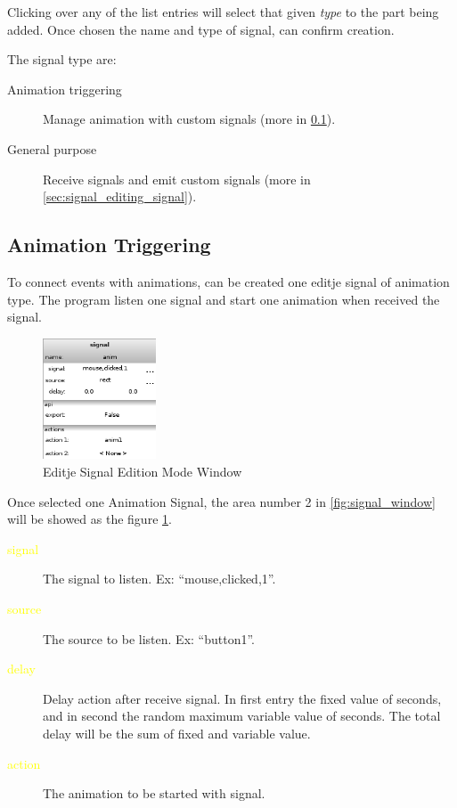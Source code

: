 \documentclass[a4paper]{profusion}
\newcommand{\GUIEditable}[1]{\textcolor{yellow}{#1}} %
\begin{document}
Clicking over any of the list entries will select that given
\emph{type} to the part being added. Once chosen the name and type of
signal, can confirm creation.

The signal type are:
\begin{description}
 \item[Animation triggering] Manage animation with custom signals (more in
   \ref{sec:signal_editing_animation}).
 \item[General purpose] Receive signals and emit custom signals (more in
   \ref{sec:signal_editing_signal}).
\end{description}

\subsection{Animation Triggering}
\label{sec:signal_editing_animation}

To connect events with animations, can be created one editje signal of
animation type. The program listen one signal and start one animation
when received the signal.

\begin{figure}
 \centering
 \includegraphics[width=0.3\textwidth]{./images/signal_anim.png}
 \caption{Editje Signal Edition Mode Window}
 \label{fig:signal_animation_config}
\end{figure}

Once selected one Animation Signal, the area number 2 in
\ref{fig:signal_window} will be showed as the figure
\ref{fig:signal_animation_config}.

\begin{description}
 \item[\GUIEditable{signal}] The signal to listen. Ex:
   ``mouse,clicked,1''.
 \item[\GUIEditable{source}] The source to be listen. Ex: ``button1''.
 \item[\GUIEditable{delay}] Delay action after receive signal. In
   first entry the fixed value of seconds, and in second the random
   maximum variable value of seconds.  The total delay will be the sum
   of fixed and variable value.
 \item[\GUIEditable{action}] The animation to be started with signal.
\end{description}
\end{document}

